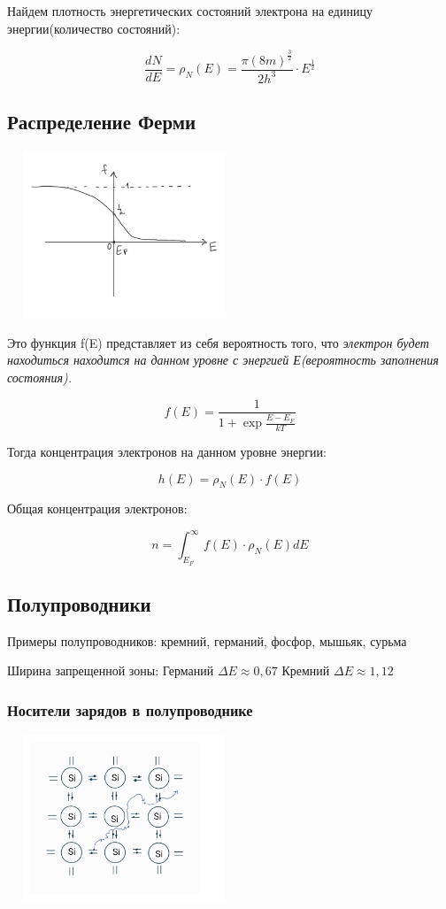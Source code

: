 \documentclass[../main.tex]{subfiles}
\begin{document}
Найдем плотность энергетических состояний электрона на единицу энергии(количество состояний): 

\[\frac{dN}{dE} = \rho_N(E) = \frac{\pi (8m)^{\frac{3}{2}}}{2 h^3} \cdot E^{\frac{1}{2}}\]

\subsection{Распределение Ферми}
\begin{center}
    \includegraphics[height=5cm, width=7cm]{../img/kvantovy10.png}
\end{center}
Это функция f(E) представляет из себя вероятность того, что \textit{электрон будет находиться находится на данном уровне с энергией Е(вероятность заполнения состояния).}

\[f(E) = \frac{1}{1 + \exp{\frac{E-E_F}{kT}}}\]

Тогда концентрация электронов на данном уровне энергии:

\[h(E) = \rho_N(E) \cdot f(E)\]

Общая концентрация электронов:

\[n = \int_{E_F}^{\infty} f(E) \cdot \rho_N(E) dE\]

\subsection{Полупроводники}

Примеры полупроводников: кремний, германий, фосфор, мышьяк, сурьма

Ширина запрещенной зоны: Германий $\Delta E \approx 0,67$ Кремний $\Delta E \approx 1,12$

\subsubsection{Носители зарядов в полупроводнике}

\begin{center}
    \includegraphics[height=5cm, width=7cm]{../img/kvantovy11.png}
\end{center}
\end{document}

